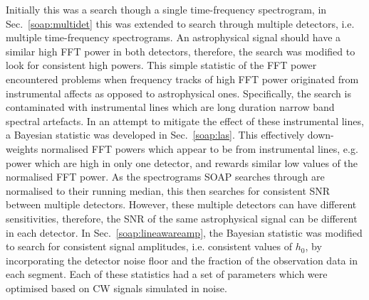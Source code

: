 Initially this was a search though a single time-frequency spectrogram, in Sec.~\ref{soap:multidet} this was extended to search through multiple detectors, i.e. multiple time-frequency spectrograms.
An astrophysical signal should have a similar high \gls{FFT} power in both detectors, therefore, the search was modified to look for consistent high powers.
This simple statistic of the \gls{FFT} power encountered problems when frequency tracks of high \gls{FFT} power originated from instrumental affects as opposed to astrophysical ones.
Specifically, the search is contaminated with instrumental lines which are long duration narrow band spectral artefacts. 
In an attempt to mitigate the effect of these instrumental lines, a Bayesian statistic was developed in Sec.~\ref{soap:las}.
This effectively down-weights normalised \gls{FFT} powers which appear to be from instrumental lines, e.g. power which are high in only one detector, and rewards similar low values of the normalised \gls{FFT} power.
As the spectrograms SOAP searches through are normalised to their running median, this then searches for consistent \gls{SNR} between multiple detectors.
However, these multiple detectors can have different sensitivities, therefore, the \gls{SNR} of the same astrophysical signal can be different in each detector.
In Sec.~\ref{soap:lineawareamp}, the Bayesian statistic was modified to search for consistent signal amplitudes, i.e. consistent values of $h_0$, by incorporating the detector noise floor and the fraction of the observation data in each segment.
Each of these statistics had a set of parameters which were optimised based on \gls{CW} signals simulated in noise. 

